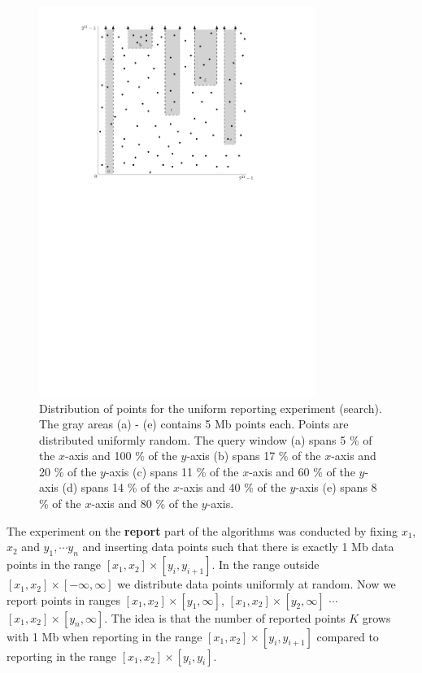 \documentclass[twoside,11pt,openright]{report}
\begin{document}
\begin{figure}[h]
	\centering
	\includegraphics[width=0.8\textwidth]{../figures/query_uniform}
	\caption{Distribution of points for the uniform reporting experiment (search). The gray areas (a) - (e) contains 5 Mb points each. Points are distributed uniformly random. The query window (a) spans 5 \% of the $x$-axis and 100 \% of the $y$-axis (b) spans 17 \% of the $x$-axis and 20 \% of the $y$-axis (c) spans 11 \% of the $x$-axis and 60 \% of the $y$-axis (d) spans 14 \% of the $x$-axis and 40 \% of the $y$-axis (e) spans 8 \% of the $x$-axis and 80 \% of the $y$-axis.}
	\label{fig:experiment_query_uniform}
\end{figure}

The experiment on the \textbf{report} part of the algorithms was conducted by fixing $x_1$, $x_2$ and $y_1, \cdots y_n$ and inserting data points such that there is exactly 
1 Mb data points in the range $[x_1, x_2] \times [y_i, y_{i+1}]$. In the range outside  $[x_1, x_2] \times [- \infty, \infty]$ we distribute data points uniformly at random. Now we report points in ranges $[x_1, x_2] \times [y_1, \infty]$, $[x_1, x_2] \times [y_2, \infty]$ $\cdots$ $[x_1, x_2] \times [y_n, \infty]$. The idea is that the number of reported points $K$ grows with 1 Mb when reporting in the range $[x_1, x_2] \times [y_i, y_{i+1}]$ compared to reporting in the range $[x_1, x_2] \times [y_i, y_{i}]$.
\end{document}

